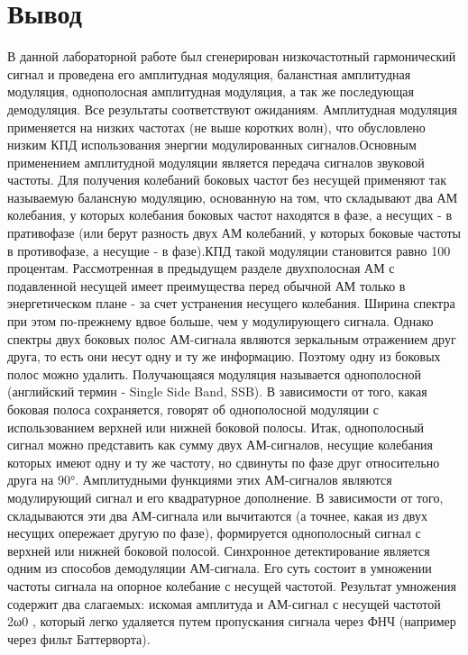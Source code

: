\documentclass[10pt,a4paper]{report}
\begin{document}
\section{Вывод}
В данной лабораторной работе был сгенерирован низкочастотный гармонический сигнал и проведена его амплитудная модуляция, баланстная амплитудная модуляция, однополосная амплитудная модуляция, а так же последующая демодуляция. Все результаты соответствуют ожиданиям.
Амплитудная модуляция применяется на низких частотах (не выше коротких волн), что обусловлено низким КПД использования энергии модулированных сигналов.Основным применением амплитудной модуляции является передача сигналов звуковой частоты.
Для получения колебаний боковых частот без несущей применяют так называемую балансную модуляцию, основанную на том, что складывают два АМ колебания, у которых колебания боковых частот находятся в фазе, а несущих - в пративофазе (или берут разность двух АМ колебаний, у которых боковые частоты в противофазе, а несущие - в фазе).КПД такой модуляции становится равно 100 процентам.
Рассмотренная в предыдущем разделе двухполосная АМ с подавленной несущей имеет преимущества перед обычной АМ только в энергетическом плане - за счет устранения несущего колебания. Ширина спектра при этом по-прежнему вдвое больше, чем у модулирующего сигнала. Однако спектры двух боковых полос АМ-сигнала являются зеркальным отражением друг друга, то есть они несут одну и ту же информацию. Поэтому одну из боковых полос можно удалить. Получающаяся модуляция называется однополосной (английский термин - Single Side Band, SSB).
В зависимости от того, какая боковая полоса сохраняется, говорят об однополосной модуляции с использованием верхней или нижней боковой полосы.
Итак, однополосный сигнал можно представить как сумму двух АМ-сигналов, несущие колебания которых имеют одну и ту же частоту, но сдвинуты по фазе друг относительно друга на 90°. Амплитудными функциями этих АМ-сигналов являются модулирующий сигнал и его квадратурное дополнение. В зависимости от того, складываются эти два АМ-сигнала или вычитаются (а точнее, какая из двух несущих опережает другую по фазе), формируется однополосный сигнал с верхней или нижней боковой полосой.
Синхронное детектирование является одним из способов демодуляции АМ-сигнала. Его суть состоит в умножении частоты сигнала на опорное колебание с несущей частотой. Результат умножения содержит два слагаемых: искомая амплитуда и АМ-сигнал с несущей частотой 2ω0 , который легко удаляется путем пропускания сигнала через ФНЧ (например через фильт Баттерворта).
\end{document}
